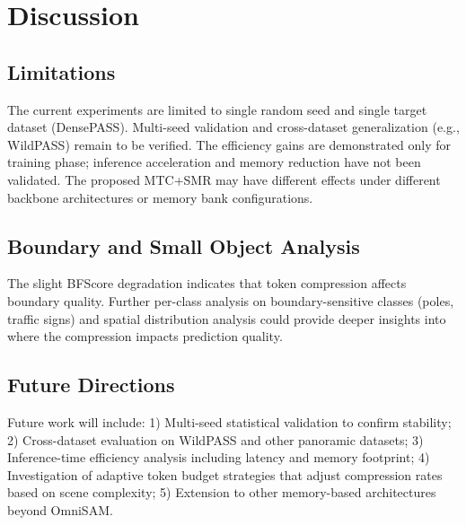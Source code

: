 \section{Discussion}
\label{sec:discussion}

\subsection{Limitations}
The current experiments are limited to single random seed and single target dataset (DensePASS). Multi-seed validation and cross-dataset generalization (e.g., WildPASS) remain to be verified. The efficiency gains are demonstrated only for training phase; inference acceleration and memory reduction have not been validated. The proposed MTC+SMR may have different effects under different backbone architectures or memory bank configurations.

\subsection{Boundary and Small Object Analysis}
The slight BFScore degradation indicates that token compression affects boundary quality. Further per-class analysis on boundary-sensitive classes (poles, traffic signs) and spatial distribution analysis could provide deeper insights into where the compression impacts prediction quality.

\subsection{Future Directions}
Future work will include: 1) Multi-seed statistical validation to confirm stability; 2) Cross-dataset evaluation on WildPASS and other panoramic datasets; 3) Inference-time efficiency analysis including latency and memory footprint; 4) Investigation of adaptive token budget strategies that adjust compression rates based on scene complexity; 5) Extension to other memory-based architectures beyond OmniSAM.
